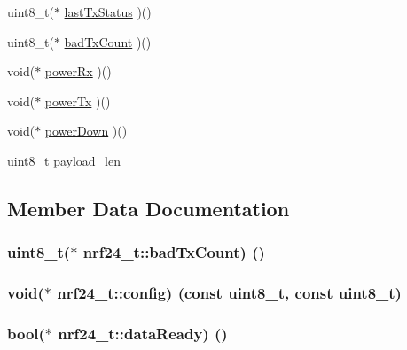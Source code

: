 \begin{DoxyCompactItemize}
\item 
uint8\+\_\+t($\ast$ \hyperlink{structnrf24__t_a2329173d4dd74a06cf2ee40f24a63732}{last\+Tx\+Status} )()
\item 
uint8\+\_\+t($\ast$ \hyperlink{structnrf24__t_a68c5c9c097c40be2e4058519386be051}{bad\+Tx\+Count} )()
\item 
void($\ast$ \hyperlink{structnrf24__t_ab25e37a1480a77544d05e50d395388cb}{power\+Rx} )()
\item 
void($\ast$ \hyperlink{structnrf24__t_a92ed761e9c215786b80685a915ce87d7}{power\+Tx} )()
\item 
void($\ast$ \hyperlink{structnrf24__t_aead930e67d5d5eb04822cb4ae990685d}{power\+Down} )()
\item 
uint8\+\_\+t \hyperlink{structnrf24__t_a169e5d060ccd36a6387c15bb49daf09f}{payload\+\_\+len}
\end{DoxyCompactItemize}


\subsection{Member Data Documentation}
\hypertarget{structnrf24__t_a68c5c9c097c40be2e4058519386be051}{}
\subsubsection[{bad\+Tx\+Count}]{\setlength{\rightskip}{0pt plus 5cm}uint8\+\_\+t($\ast$ nrf24\+\_\+t\+::bad\+Tx\+Count) ()}\label{structnrf24__t_a68c5c9c097c40be2e4058519386be051}
\hypertarget{structnrf24__t_a84a2a68d2e139d5d1f12b26f1883f401}{}
\subsubsection[{config}]{\setlength{\rightskip}{0pt plus 5cm}void($\ast$ nrf24\+\_\+t\+::config) (const uint8\+\_\+t, const uint8\+\_\+t)}\label{structnrf24__t_a84a2a68d2e139d5d1f12b26f1883f401}
\hypertarget{structnrf24__t_ae3ba9b440dc852e8ef9ddc43304f3228}{}
\subsubsection[{data\+Ready}]{\setlength{\rightskip}{0pt plus 5cm}bool($\ast$ nrf24\+\_\+t\+::data\+Ready) ()}\label{structnrf24__t_ae3ba9b440dc852e8ef9ddc43304f3228}
\hypertarget{structnrf24__t_ad0896af4e3e40a15bd991aec48769cd4}{}
